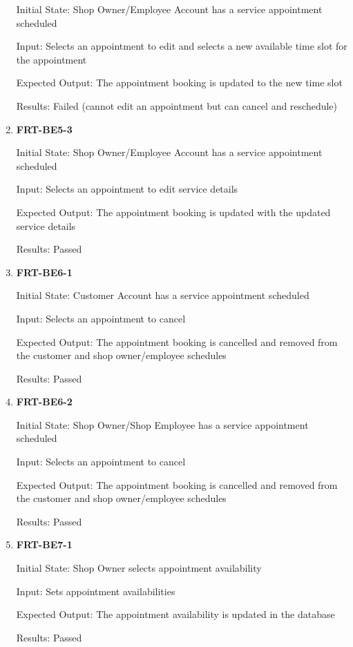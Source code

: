 \documentclass[12pt, titlepage]{article}
\begin{document}
\begin{enumerate}
	      Initial State: Shop Owner/Employee Account has a service appointment scheduled

	      Input: Selects an appointment to edit and selects a new available time slot for the appointment

	      Expected Output: The appointment booking is updated to the new time slot

	      Results: Failed (cannot edit an appointment but can cancel and reschedule)

	\item \textbf{FRT-BE5-3}

	      Initial State: Shop Owner/Employee Account has a service appointment scheduled

	      Input: Selects an appointment to edit service details

	      Expected Output: The appointment booking is updated with the updated service details

	      Results: Passed

	\item \textbf{FRT-BE6-1}

	      Initial State: Customer Account has a service appointment scheduled

	      Input: Selects an appointment to cancel

	      Expected Output: The appointment booking is cancelled and removed from the customer and shop
	      owner/employee schedules

	      Results: Passed

	\item \textbf{FRT-BE6-2}

	      Initial State: Shop Owner/Shop Employee has a service appointment scheduled

	      Input: Selects an appointment to cancel

	      Expected Output: The appointment booking is cancelled and removed from the customer and shop
	      owner/employee schedules

	      Results: Passed

	\item \textbf{FRT-BE7-1}

	      Initial State: Shop Owner selects appointment availability

	      Input: Sets appointment availabilities

	      Expected Output: The appointment availability is updated in the database

	      Results: Passed

\end{enumerate}
\end{document}
